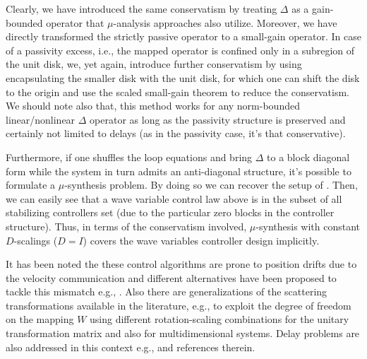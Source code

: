 Clearly, we have introduced the same conservatism by treating $\Delta$ as a gain-bounded operator 
that $\mu$-analysis approaches also utilize. Moreover, we have directly transformed the strictly passive 
operator to a small-gain operator. In case of a passivity excess, i.e., the mapped operator is confined only 
in a subregion of the unit disk, we, yet again, introduce further conservatism by using encapsulating the smaller disk 
with the unit disk, for which one can shift the disk to the origin and use the scaled small-gain theorem to reduce the 
conservatism. We should note also that, this method works for any norm-bounded linear/nonlinear $\Delta$ operator as long as the 
passivity structure is preserved and certainly not limited to delays (as in the passivity case, it's that conservative). 

Furthermore, if one shuffles the loop equations and bring $\Delta$ to a block diagonal form while the system in turn admits 
an anti-diagonal structure, it's possible to formulate a $\mu$-synthesis problem. By doing so we can recover the setup of 
\cite{leungfa}. Then, we can easily see that a wave variable control law above is in the subset of all stabilizing controllers 
set (due to the particular zero blocks in the controller structure). Thus, in terms of the conservatism involved, $\mu$-synthesis 
with constant $D$-scalings ($D=I$) covers the wave variables controller design implicitly.

It has been noted the these control algorithms are prone to position drifts due to the velocity communication and 
different alternatives have been proposed to tackle this mismatch e.g., \cite{yokokohji,chopratro06}. 
Also there are generalizations of the scattering transformations available in the literature, e.g., 
\cite{hirchebuss} to exploit the degree of freedom on the mapping $W$ using different rotation-scaling 
combinations for the unitary transformation matrix and also \cite{stramigioli} for multidimensional systems. 
Delay problems are also addressed in this context e.g., \cite{chopraberes,munirbook,nieslotine97,uedayoshikawa} 
and references therein. 



